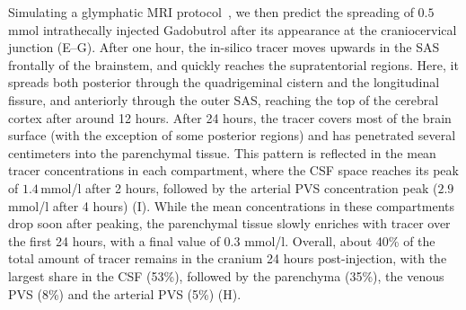 \documentclass[fleqn,10pt]{wlscirep}
\begin{document}
Simulating a glymphatic MRI protocol~\cite{ringstad2017glymphatic,
  ringstad2018brain, eide2024functional}, we then predict the
spreading of $0.5$ mmol intrathecally injected Gadobutrol after its
appearance at the craniocervical junction
(E--G). After one hour, the in-silico
tracer moves upwards in the SAS frontally of the brainstem, and
quickly reaches the supratentorial regions. Here, it spreads both
posterior through the quadrigeminal cistern and the longitudinal
fissure, and anteriorly through the outer SAS, reaching the top of the
cerebral cortex after around 12 hours. After 24 hours, the tracer
covers most of the brain surface (with the exception of some posterior
regions) and has penetrated several centimeters into the parenchymal
tissue. This pattern is reflected in the mean tracer concentrations in
each compartment, where the CSF space reaches its peak of
$1.4\,$mmol/l after 2 hours, followed by the arterial PVS
concentration peak ($2.9\,$mmol/l after 4 hours)
(I). While the mean concentrations in these
compartments drop soon after peaking, the parenchymal tissue
slowly enriches with tracer over the first 24 hours, with a final
value of $0.3$ mmol/l. Overall, about 40\% of the total amount of
tracer remains in the cranium 24 hours post-injection, with the largest
share in the CSF (53\%), followed by the parenchyma (35\%), the
venous PVS (8\%) and the arterial PVS
(5\%) (H).
\end{document}

